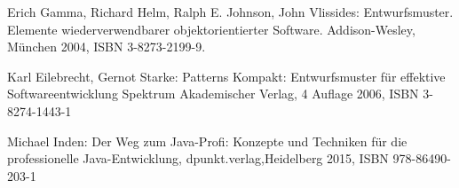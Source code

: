 %
%

\begin{thebibliography}{12cm}

 Erich Gamma, Richard Helm, Ralph E. Johnson, John Vlissides: Entwurfsmuster. Elemente wiederverwendbarer objektorientierter Software. Addison-Wesley, München 2004, ISBN 3-8273-2199-9.

 Karl Eilebrecht, Gernot Starke: Patterns Kompakt: Entwurfsmuster für effektive Softwareentwicklung Spektrum Akademischer Verlag, 4 Auflage 2006, ISBN 3-8274-1443-1

 Michael Inden: Der Weg zum Java-Profi: Konzepte und Techniken für die professionelle Java-Entwicklung, dpunkt.verlag,Heidelberg 2015, ISBN 978-86490-203-1

   

\end{thebibliography}